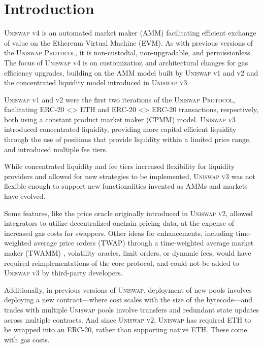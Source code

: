 \documentclass[sigconf,nonacm,prologue,table]{acmart}
\numberwithin{equation}{section}
\theoremstyle{definition}
\theoremstyle{remark}
\begin{document}
\section{Introduction} \label{sec:introduction}
\textsc{Uniswap v4} is an automated market maker (AMM) facilitating efficient exchange of value on the Ethereum Virtual Machine (EVM). As with previous versions of the \textsc{Uniswap Protocol}, it is non-custodial, non-upgradable, and permissionless. The focus of \textsc{Uniswap v4} is on customization and architectural changes for gas efficiency upgrades, building on the AMM model built by \textsc{Uniswap v1} and \textsc{v2} and the concentrated liquidity model introduced in \textsc{Uniswap v3}.

\textsc{Uniswap v1} \cite{Adams18} and \textsc{v2} \cite{Adams20} were the first two iterations of the \textsc{Uniswap Protocol}, facilitating ERC-20 <> ETH and ERC-20 <> ERC-20 transactions, respectively, both using a constant product market maker (CPMM) model. \textsc{Uniswap v3} \cite{Adams21} introduced concentrated liquidity, providing more capital efficient liquidity through the use of positions that provide liquidity within a limited price range, and introduced multiple fee tiers.

While concentrated liquidity and fee tiers increased flexibility for liquidity providers and allowed for new strategies to be implemented, \textsc{Uniswap v3} was not flexible enough to support new functionalities invented as AMMs and markets have evolved.

Some features, like the price oracle originally introduced in \textsc{Uniswap v2}, allowed integrators to utilize decentralized onchain pricing data, at the expense of increased gas costs for swappers. Other ideas for enhancements, including time-weighted average price orders (TWAP) through a time-weighted average market maker (TWAMM) \cite{White2021}, volatility oracles, limit orders, or dynamic fees, would have required reimplementations of the core protocol, and could not be added to \textsc{Uniswap v3} by third-party developers.

Additionally, in previous versions of \textsc{Uniswap}, deployment of new pools involves deploying a new contract—where cost scales with the size of the bytecode—and trades with multiple \textsc{Uniswap} pools involve transfers and redundant state updates across multiple contracts. And since \textsc{Uniswap v2}, \textsc{Uniswap} has required ETH to be wrapped into an ERC-20, rather than supporting native ETH. These come with gas costs.
\end{document}

